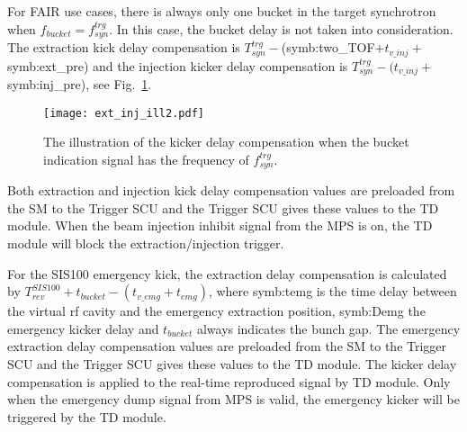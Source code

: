 For FAIR use cases, there is always only one bucket in the target synchrotron when $f_{\mathit{bucket}}=f_{\mathit{syn}}^{\mathit{trg}}$. In this case, the bucket delay is not taken into consideration. The extraction kick delay compensation is $T_{\mathit{syn}}^{\mathit{trg}} -$(\gls{symb:two_TOF}$ + t_{v\_inj}+ $\gls{symb:ext_pre}) and the injection kicker delay compensation is $T_{\mathit{syn}}^{\mathit{trg}} - (t_{v\_inj}+ $\gls{symb:inj_pre}), see Fig.~\ref{ext_inj_kicker1}. 
\begin{figure}[!htb]
   \centering   
   \texttt{[image: ext\_inj\_ill2.pdf]}
   \caption{The illustration of the kicker delay compensation when the bucket indication signal has the frequency of $f_{\mathit{syn}}^{\mathit{trg}}$.}
   \label{ext_inj_kicker1}
\end{figure}



Both extraction and injection kick delay compensation values are preloaded from the SM to the Trigger SCU and the Trigger SCU gives these values to the TD module. When the beam injection inhibit signal from the MPS is on, the TD module will block the extraction/injection trigger.

For the SIS100 emergency kick, the extraction delay compensation is calculated by $T_{\mathit{rev}}^{\mathit{SIS100}} + t_{bucket} - (t_{v\_emg} + t_{emg})$, where \gls{symb:temg} is the time delay between the virtual rf cavity and the emergency extraction position, \gls{symb:Demg} the emergency kicker delay and $t_{bucket}$ always indicates the bunch gap. The emergency extraction delay compensation values are preloaded from the SM to the Trigger SCU and the Trigger SCU gives these values to the TD module. The kicker delay compensation is applied to the real-time reproduced signal by TD module. Only when the emergency dump signal from MPS is valid, the emergency kicker will be triggered by the TD module.



